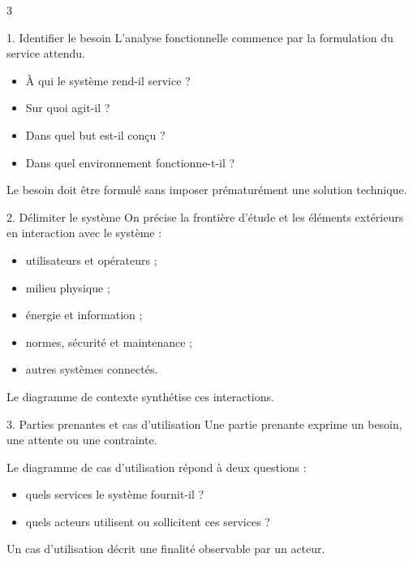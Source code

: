 \documentclass[a3paper,landscape,10pt]{article}
\begin{document}

\begin{multicols}{3}

\begin{TLPosterBloc}{1. Identifier le besoin}
L'analyse fonctionnelle commence par la formulation du service attendu.
\begin{itemize}
  \item À qui le système rend-il service ?
  \item Sur quoi agit-il ?
  \item Dans quel but est-il conçu ?
  \item Dans quel environnement fonctionne-t-il ?
\end{itemize}
Le besoin doit être formulé sans imposer prématurément une solution technique.
\end{TLPosterBloc}

\begin{TLPosterBloc}{2. Délimiter le système}
On précise la frontière d'étude et les éléments extérieurs en interaction avec le système :
\begin{itemize}
  \item utilisateurs et opérateurs ;
  \item milieu physique ;
  \item énergie et information ;
  \item normes, sécurité et maintenance ;
  \item autres systèmes connectés.
\end{itemize}
Le diagramme de contexte synthétise ces interactions.
\end{TLPosterBloc}

\begin{TLPosterBloc}{3. Parties prenantes et cas d'utilisation}
Une partie prenante exprime un besoin, une attente ou une contrainte.

Le diagramme de cas d'utilisation répond à deux questions :
\begin{itemize}
  \item quels services le système fournit-il ?
  \item quels acteurs utilisent ou sollicitent ces services ?
\end{itemize}
Un cas d'utilisation décrit une finalité observable par un acteur.
\end{TLPosterBloc}


\end{multicols}
\end{document}
